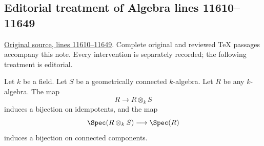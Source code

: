 \subsection{Editorial treatment of Algebra lines 11610--11649}

\hypertarget{algebra-context-153}{}

\noindent\href{https://github.com/stacks/stacks-project/blob/a04446e57ec1fbc252a871afcec7752fb2807b14/algebra.tex\#L11610}{Original source, lines 11610--11649}. Complete original and reviewed TeX passages accompany this note. Every intervention is separately recorded; the following treatment is editorial.


\begin{lemma}
\label{editorial-source-lemma-geometrically-connected-any-base-change}
Let $k$ be a field.
Let $S$ be a geometrically connected $k$-algebra.
Let $R$ be any $k$-algebra.
The map
$$
R \longrightarrow R \otimes_k S
$$
induces a bijection on idempotents, and the map
$$
\Spec(R \otimes_k S) \longrightarrow \Spec(R)
$$
induces a bijection on connected components.
\end{lemma}

